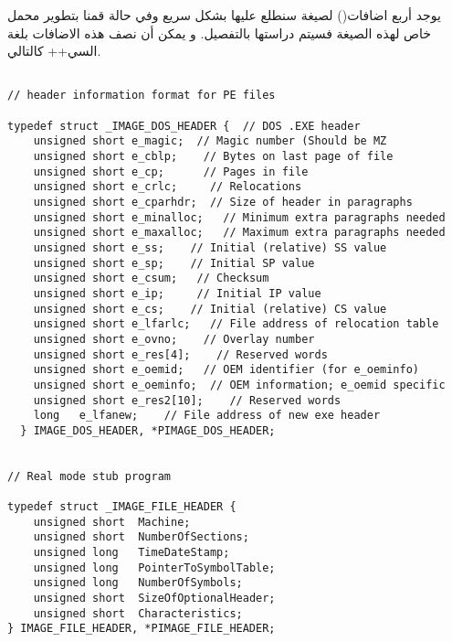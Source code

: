 \documentclass[document.tex]{subfiles}
\begin{document}

يوجد أربع اضافات() لصيغة  سنطلع عليها بشكل سريع وفي حالة قمنا بتطوير محمل خاص لهذه الصيغة فسيتم دراستها بالتفصيل. و يمكن أن نصف هذه الاضافات بلغة السي++ كالتالي.
\begin{english}

\lstset{numberstyle=\tiny,numbersep=5pt,tabsize=2,extendedchars=true,breaklines=true,frame=b,showspaces=false, showtabs=false,xleftmargin=10pt,framexleftmargin=10pt,framexrightmargin=5pt,framexbottommargin=4pt,showstringspaces=false,language=C++}


\begin{lstlisting}[label=newdelete,caption=Global new/delete operator]

// header information format for PE files 

typedef struct _IMAGE_DOS_HEADER {  // DOS .EXE header
    unsigned short e_magic;  // Magic number (Should be MZ
    unsigned short e_cblp;    // Bytes on last page of file
    unsigned short e_cp;      // Pages in file
    unsigned short e_crlc;     // Relocations
    unsigned short e_cparhdr;  // Size of header in paragraphs
    unsigned short e_minalloc;   // Minimum extra paragraphs needed
    unsigned short e_maxalloc;   // Maximum extra paragraphs needed
    unsigned short e_ss;    // Initial (relative) SS value
    unsigned short e_sp;    // Initial SP value
    unsigned short e_csum;   // Checksum
    unsigned short e_ip;     // Initial IP value
    unsigned short e_cs;    // Initial (relative) CS value
    unsigned short e_lfarlc;   // File address of relocation table
    unsigned short e_ovno;    // Overlay number
    unsigned short e_res[4];    // Reserved words
    unsigned short e_oemid;   // OEM identifier (for e_oeminfo)
    unsigned short e_oeminfo;  // OEM information; e_oemid specific
    unsigned short e_res2[10];    // Reserved words
    long   e_lfanew;    // File address of new exe header
  } IMAGE_DOS_HEADER, *PIMAGE_DOS_HEADER;

  
// Real mode stub program 

typedef struct _IMAGE_FILE_HEADER {
    unsigned short  Machine;
    unsigned short  NumberOfSections;
    unsigned long   TimeDateStamp;
    unsigned long   PointerToSymbolTable;
    unsigned long   NumberOfSymbols;
    unsigned short  SizeOfOptionalHeader;
    unsigned short  Characteristics;
} IMAGE_FILE_HEADER, *PIMAGE_FILE_HEADER;


\end{lstlisting}
\end{english}
\end{document}
